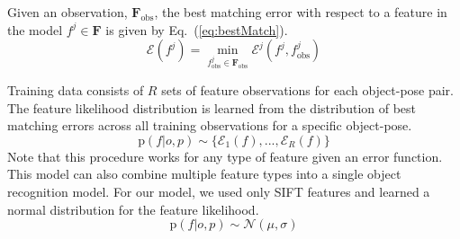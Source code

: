 \documentclass[conference]{IEEEtran}
\renewcommand{\eqref}[1]{Eq.~(\ref{#1})}
\newcommand{\prob}[1]{\text{p}(#1)} %
\newcommand{\set}[1]{\mathbf{#1}} %
\newcommand{\cursive}[1]{\mathcal{#1}}
\begin{document}



        Given an observation, $\set{F}_{\text{obs}}$, the best matching error with respect to a feature in the model $f^j \in \set{F}$ is given by \eqref{eq:bestMatch}.
        \begin{equation}
            \label{eq:bestMatch}
            \cursive{E}(f^j) = \min_{f^j_{\text{obs}} \in \set{F}_{\text{obs}}}\cursive{E}^j(f^j,f^j_{\text{obs}})
        \end{equation}
        
        Training data consists of $R$ sets of feature observations for each object-pose pair. The feature likelihood distribution is learned from the distribution of best matching errors across all training observations for a specific object-pose.
        \begin{equation}
            \prob{f|o,p} \sim \{\cursive{E}_1(f), ...,  \cursive{E}_R(f)\}
        \end{equation}
        Note that this procedure works for any type of feature given an error function. This model can also combine multiple feature types into a single object recognition model. For our model, we used only SIFT features and learned a normal distribution for the feature likelihood.   
        \begin{equation}
            \prob{f|o,p} \sim \cursive{N}(\mu,\sigma)
        \end{equation}
        
\end{document}
